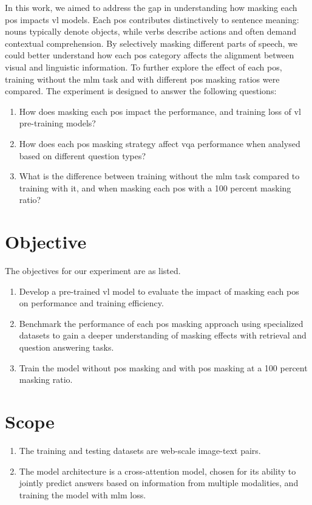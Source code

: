 In this work, we aimed to address the gap in understanding how masking each \acrfull{pos} impacts \acrshort{vl} models.  
Each \acrshort{pos} contributes distinctively to sentence meaning: nouns typically denote objects, while verbs describe actions and often demand contextual comprehension.  
By selectively masking different parts of speech, we could better understand how each \acrshort{pos} category affects the alignment between visual and linguistic information.  
To further explore the effect of each \acrshort{pos}, training without the \acrshort{mlm} task and with different \acrshort{pos} masking ratios were compared.
The experiment is designed to answer the following questions:  
\begin{enumerate}  
    \item How does masking each \acrshort{pos} impact the performance, and training loss of \acrshort{vl} pre-training models?  
    \item How does each \acrshort{pos} masking strategy affect \acrfull{vqa} performance when analysed based on different question types?  
    \item What is the difference between training without the \acrshort{mlm} task compared to training with it, and when masking each \acrshort{pos} with a 100 percent masking ratio?  
\end{enumerate}


\section{Objective}  
The objectives for our experiment are as listed.  
\begin{enumerate}  
    \item Develop a pre-trained \acrshort{vl} model to evaluate the impact of masking each \acrshort{pos} on performance and training efficiency.  
    \item Benchmark the performance of each \acrshort{pos} masking approach using specialized datasets to gain a deeper understanding of masking effects with retrieval and question answering tasks.  
    \item Train the model without \acrshort{pos} masking and with \acrshort{pos} masking at a 100 percent masking ratio.  
\end{enumerate}  

\section{Scope}
\begin{enumerate}  
    \item The training and testing datasets are web-scale image-text pairs.  
    \item The model architecture is a cross-attention model, chosen for its ability to jointly predict answers based on information from multiple modalities, and training the model with \Acrshort{mlm} loss.
\end{enumerate}  
